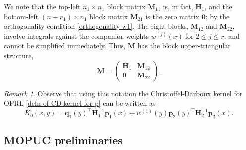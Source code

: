 \documentclass[a4paper,10pt,leqno]{amsart}
\numberwithin{equation}{section}
\theoremstyle{remark}
\newtheorem{remark}{Remark}
\newcommand{\red}[1]{{\color{red} #1}}
\begin{document}
 
We note that the top-left $n_1 \times n_1$ block matrix $\bm{M}_{11}$ is, in fact, $\bm{H}_1$, and the bottom-left $(n-n_1) \times n_1$ block matrix $\bm{M}_{21}$ is the zero matrix $\bm{0}$; by the orthogonality condition \eqref{orthogonality w1}. The right blocks, $\bm{M}_{12}$ and $\bm{M}_{22}$, involve integrals against the companion weights $w^{(j)}(x)$ for $2 \leq j \leq r$, and cannot be simplified immediately. Thus, $\bm{M}$ has the block upper-triangular structure,
\begin{equation} \label{M block structure}
    \bm{M}  = \begin{pmatrix}\bm{H}_1 & \bm{M}_{12}  \\ \bm{0} & \bm{M}_{22}  \end{pmatrix}.
\end{equation}

\begin{remark}
    Observe that using this notation the  Christoffel-Darboux kernel for  OPRL \eqref{defn of CD kernel for p}  can be written as 
     \begin{equation}\label{K0 block}
    K_0(x,y)
    =\bm q_1(y)^\top\bm H_1^{-1}\bm p_1(x)
     +w^{(1)}(y)\bm p_2(y)^\top\bm H_2^{-1}\bm p_2(x).
\end{equation}
\end{remark}


\subsection{MOPUC preliminaries}
\end{document}
